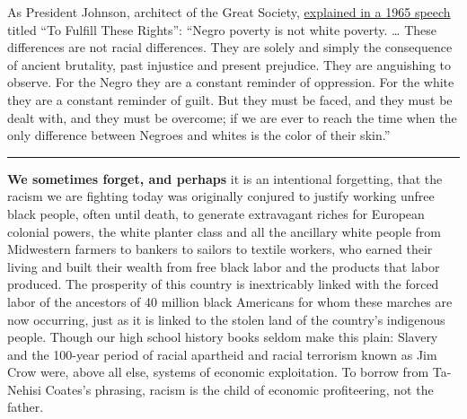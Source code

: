As President Johnson, architect of the Great Society,
\href{https://www.youtube.com/watch?v=vcfAuodA2x8}{explained in a 1965
speech} titled ``To Fulfill These Rights'': ``Negro poverty is not white
poverty. \ldots{} These differences are not racial differences. They are
solely and simply the consequence of ancient brutality, past injustice
and present prejudice. They are anguishing to observe. For the Negro
they are a constant reminder of oppression. For the white they are a
constant reminder of guilt. But they must be faced, and they must be
dealt with, and they must be overcome; if we are ever to reach the time
when the only difference between Negroes and whites is the color of
their skin.''

\begin{center}\rule{0.5\linewidth}{\linethickness}\end{center}

\textbf{We sometimes forget, and perhaps} it is an intentional
forgetting, that the racism we are fighting today was originally
conjured to justify working unfree black people, often until death, to
generate extravagant riches for European colonial powers, the white
planter class and all the ancillary white people from Midwestern farmers
to bankers to sailors to textile workers, who earned their living and
built their wealth from free black labor and the products that labor
produced. The prosperity of this country is inextricably linked with the
forced labor of the ancestors of 40 million black Americans for whom
these marches are now occurring, just as it is linked to the stolen land
of the country's indigenous people. Though our high school history books
seldom make this plain: Slavery and the 100-year period of racial
apartheid and racial terrorism known as Jim Crow were, above all else,
systems of economic exploitation. To borrow from Ta-Nehisi Coates's
phrasing, racism is the child of economic profiteering, not the father.

